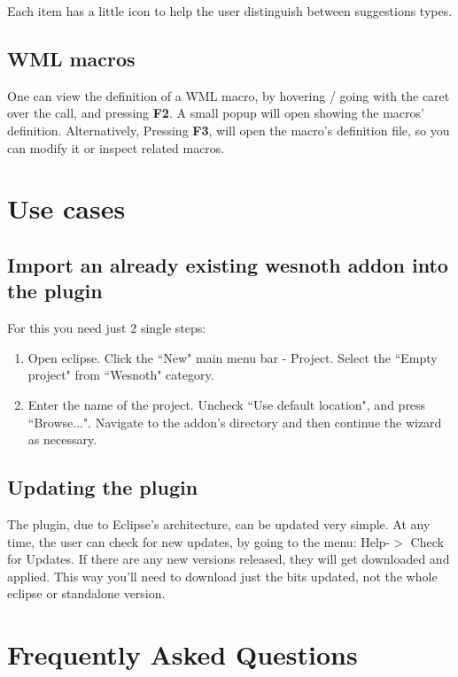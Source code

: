 \documentclass[10pt]{article}
\begin{document}
Each item has a little icon to help the user distinguish between suggestions types.

\subsection{WML macros}
One can view the definition of a WML macro, by hovering / going with the caret over the call, and pressing \textbf{F2}. A small popup will open showing the macros' definition. Alternatively, Pressing \textbf{F3}, will open the macro's definition file, so you can modify it or inspect related macros.

\section{Use cases}
\subsection{Import an already existing wesnoth addon into the plugin}
For this you need just 2 single steps:
\begin{enumerate}
\item Open eclipse. Click the ``New" main menu bar - Project. Select the ``Empty project" from ``Wesnoth" category.
\item Enter the name of the project. Uncheck ``Use default location", and press ``Browse...". Navigate to the addon's directory and then continue the wizard as necessary.
\end{enumerate}

\subsection{Updating the plugin}
The plugin, due to Eclipse's architecture, can be updated very simple. At any time, the user can check for new updates, by going to the menu: Help-$>$ Check for Updates. If there are any new versions released, they will get downloaded and applied. This way you'll need to download just the bits updated, not the whole eclipse or standalone version.

\section{Frequently Asked Questions}
\end{document}
